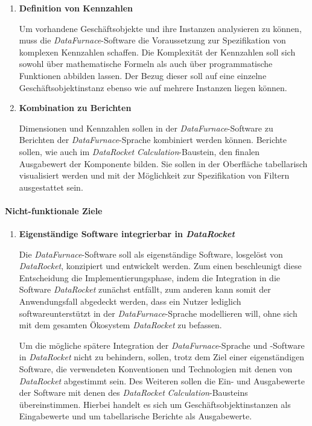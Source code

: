 \documentclass[
  language=german, %
  type=bachelor,%
  ngerman
]{isthesis}
\begin{document}
\begin{content}
\begin{enumerate}
    \item \textbf{Definition von Kennzahlen}

      Um vorhandene Geschäftsobjekte und ihre Instanzen analysieren zu können,
      muss die \textit{DataFurnace}-Software die Voraussetzung zur
      Spezifikation von komplexen Kennzahlen schaffen. Die Komplexität der
      Kennzahlen soll sich sowohl über mathematische Formeln als auch
      über programmatische Funktionen abbilden lassen. Der Bezug dieser soll auf
      eine einzelne Geschäftsobjektinstanz ebenso wie auf mehrere Instanzen
      liegen können.

    \item \textbf{Kombination zu Berichten}

      Dimensionen und Kennzahlen sollen in der \textit{DataFurnace}-Software zu
      Berichten der \textit{DataFurnace}-Sprache kombiniert werden können.
      Berichte sollen, wie auch im \textit{DataRocket}
      \textit{Calculation}-Baustein, den finalen Ausgabewert der Komponente
      bilden. Sie sollen in der Oberfläche tabellarisch visualisiert werden und
      mit der Möglichkeit zur Spezifikation von Filtern ausgestattet sein.

  \end{enumerate}

  \paragraph{Nicht-funktionale Ziele}
  \begin{enumerate}

    \item \textbf{Eigenständige Software integrierbar in \textit{DataRocket}}

      Die \textit{DataFurnace}-Software soll als eigenständige Software,
      losgelöst von \textit{DataRocket}, konzipiert und entwickelt werden. Zum
      einen beschleunigt diese Entscheidung die Implementierungsphase, indem
      die Integration in die Software \textit{DataRocket} zunächst entfällt,
      zum anderen kann somit der Anwendungsfall abgedeckt werden, dass ein Nutzer
      lediglich softwareunterstützt in der \textit{DataFurnace}-Sprache
      modellieren will, ohne sich mit dem gesamten Ökosystem
      \textit{DataRocket} zu befassen.

      Um die mögliche spätere Integration der \textit{DataFurnace}-Sprache und
      -Software in \textit{DataRocket} nicht zu behindern, sollen, trotz dem
      Ziel einer eigenständigen Software, die verwendeten Konventionen und
      Technologien mit denen von \textit{DataRocket} abgestimmt sein.  Des
      Weiteren sollen die Ein- und Ausgabewerte der Software mit denen des
      \textit{DataRocket} \textit{Calculation}-Bausteins übereinstimmen.
      Hierbei handelt es sich um Geschäftsobjektinstanzen als Eingabewerte und
      um tabellarische Berichte als Ausgabewerte.


\end{enumerate}
\end{content}
\end{document}
